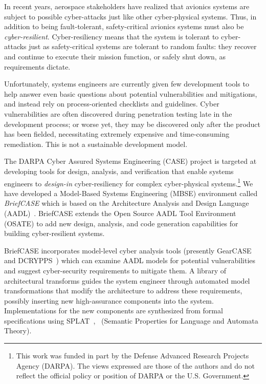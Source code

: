 In recent years, aerospace stakeholders have realized that avionics systems are subject to possible cyber-attacks just like other cyber-physical systems.  Thus, in addition to being fault-tolerant, safety-critical avionics systems must also be {\em cyber-resilient}. Cyber-resiliency means that the system is tolerant to cyber-attacks just as safety-critical systems are tolerant to random faults: they recover and continue to execute their mission function, or safely shut down, as requirements dictate.

Unfortunately, systems engineers are currently given few development tools to help answer even basic questions about potential vulnerabilities and mitigations, and instead rely on process-oriented checklists and guidelines.  Cyber vulnerabilities are often discovered during penetration testing late in the development process; or worse yet, they may be discovered only after the product has been fielded, necessitating extremely expensive and time-consuming remediation. This is not a sustainable development model.

The DARPA Cyber Assured Systems Engineering (CASE) project is targeted at developing tools for design, analysis, and verification that enable systems engineers to {\em design-in} cyber-resiliency for complex cyber-physical systems.\footnote{This work was funded in part by the Defense Advanced Research Projects Agency (DARPA).  The views expressed are those of the authors and do not reflect the official policy or position of DARPA or the U.S. Government.}
We have developed a Model-Based Systems Engineering (MBSE) environment called {\em BriefCASE} which is based on the Architecture Analysis and Design Language (AADL)~\cite{aadl}.  BriefCASE extends the Open Source AADL Tool Environment (OSATE) to add new design, analysis, and code generation capabilities for building cyber-resilient systems.

BriefCASE incorporates model-level cyber analysis tools (presently
GearCASE~\cite{gearcase2020} and DCRYPPS~\cite{dcrypps2019}) which can
examine AADL models for potential vulnerabilities and suggest
cyber-security requirements to mitigate them.  A library of
architectural transforms guides the system engineer through automated
model transformations that modify the architecture to address these
requirements, possibly inserting new high-assurance components into
the system.  Implementations for the new components are synthesized
from formal specifications using
SPLAT~\cite{slind-hcss2020},~\cite{formal-filter-synth-langsec}
(Semantic Properties for Language and Automata Theory).

